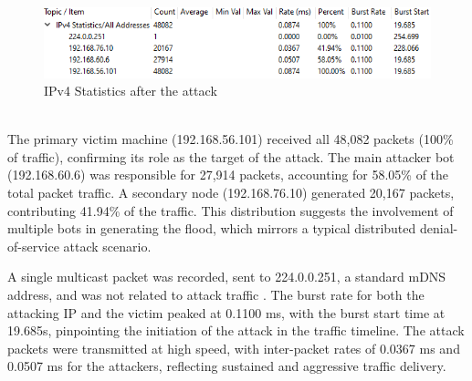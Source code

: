 \begin{table}[!htb]
    \centering
    \caption{Wireshark statistics after attack}
    \label{tab:my_label}
\end{table}
\\
\begin{figure}[!htb]
    \centering
    \includegraphics[width=0.8\linewidth]{thesis/wiresharkCapture1.png}
    \caption{IPv4 Statistics after the attack}
    \label{fig:enter-label}
\end{figure}
\\
The primary victim machine (192.168.56.101) received all 48,082 packets (100\% of traffic), confirming its role as the target of the attack. The main attacker bot (192.168.60.6) was responsible for 27,914 packets, accounting for 58.05\% of the total packet traffic. A secondary node (192.168.76.10) generated 20,167 packets, contributing 41.94\% of the traffic. This distribution suggests the involvement of multiple bots in generating the flood, which mirrors a typical distributed denial-of-service attack scenario.

A single multicast packet was recorded, sent to 224.0.0.251, a standard mDNS address, and was not related to attack traffic \cite{cirani2018internet}. The burst rate for both the attacking IP and the victim peaked at 0.1100 ms, with the burst start time at 19.685s, pinpointing the initiation of the attack in the traffic timeline. The attack packets were transmitted at high speed, with inter-packet rates of 0.0367 ms and 0.0507 ms for the attackers, reflecting sustained and aggressive traffic delivery.
\\
